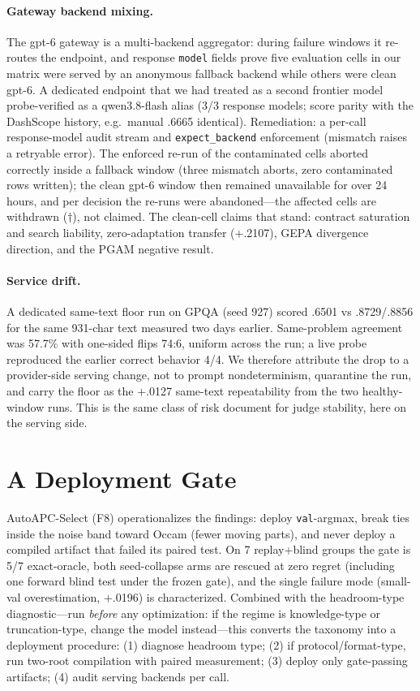 \documentclass[11pt]{article}
\begin{document}
\paragraph{Gateway backend mixing.} The gpt-6 gateway is a multi-backend aggregator: during failure windows it re-routes the endpoint, and response \texttt{model} fields prove five evaluation cells in our matrix were served by an anonymous fallback backend while others were clean gpt-6. A dedicated endpoint that we had treated as a second frontier model probe-verified as a qwen3.8-flash alias (3/3 response models; score parity with the DashScope history, e.g.\ manual .6665 identical). Remediation: a per-call response-model audit stream and \texttt{expect\_backend} enforcement (mismatch raises a retryable error). The enforced re-run of the contaminated cells aborted correctly inside a fallback window (three mismatch aborts, zero contaminated rows written); the clean gpt-6 window then remained unavailable for over 24 hours, and per decision the re-runs were abandoned---the affected cells are withdrawn ($\dagger$), not claimed. The clean-cell claims that stand: contract saturation and search liability, zero-adaptation transfer ($+$.2107), GEPA divergence direction, and the PGAM negative result.

\paragraph{Service drift.} A dedicated same-text floor run on GPQA (seed 927) scored .6501 vs .8729/.8856 for the same 931-char text measured two days earlier. Same-problem agreement was 57.7\% with one-sided flips 74:6, uniform across the run; a live probe reproduced the earlier correct behavior 4/4. We therefore attribute the drop to a provider-side serving change, not to prompt nondeterminism, quarantine the run, and carry the floor as the $+$.0127 same-text repeatability from the two healthy-window runs. This is the same class of risk \citet{zheng2023judging} document for judge stability, here on the serving side.

\section{A Deployment Gate}
\label{sec:gate}

AutoAPC-Select (F8) operationalizes the findings: deploy \texttt{val}-argmax, break ties inside the noise band toward Occam (fewer moving parts), and never deploy a compiled artifact that failed its paired test. On 7 replay+blind groups the gate is 5/7 exact-oracle, both seed-collapse arms are rescued at zero regret (including one forward blind test under the frozen gate), and the single failure mode (small-val overestimation, $+$.0196) is characterized. Combined with the headroom-type diagnostic---run \emph{before} any optimization: if the regime is knowledge-type or truncation-type, change the model instead---this converts the taxonomy into a deployment procedure: (1) diagnose headroom type; (2) if protocol/format-type, run two-root compilation with paired measurement; (3) deploy only gate-passing artifacts; (4) audit serving backends per call.
\end{document}
